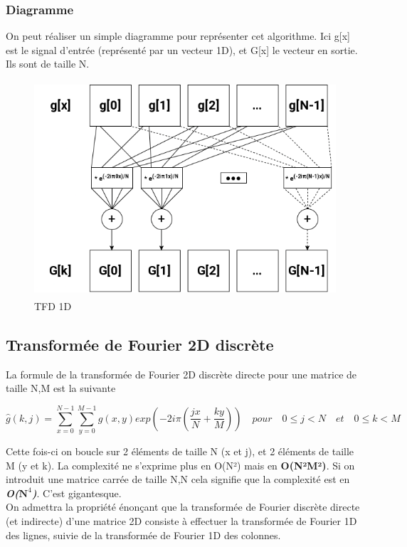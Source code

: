 \documentclass{article}
\begin{document}
\subsubsection{Diagramme}

On peut réaliser un simple diagramme pour représenter cet algorithme. Ici g[x] est le signal d'entrée (représenté par un vecteur 1D), et G[x] le vecteur en sortie. Ils sont de taille N.

\begin{figure}[!htb]
	\centering
	\includegraphics[height=8cm]{./assets/TFD1D.png}
	\caption{TFD 1D}
	\label{fig:TFD1D}
\end{figure}

\subsection{Transformée de Fourier 2D discrète}

La formule de la transformée de Fourier 2D discrète directe pour une matrice de taille N,M est la suivante

\begin{equation}
	\widehat{g}(k,j) = \sum_{x = 0}^{N-1}\sum_{y = 0}^{M-1}g(x,y) exp(-2i\pi(\frac{jx}{N}+\frac{ky}{M})) \quad pour \quad 0 \leq j < N\quad et \quad 0 \leq k < M
\end{equation}

Cette fois-ci on boucle sur 2 éléments de taille N (x et j), et 2 éléments de taille M (y et k). La complexité ne s'exprime plus en O(N²) mais en \textbf{O(N²M²)}. Si on introduit une matrice carrée de taille N,N cela signifie que la complexité est en \textbf{\textit{O($\textbf{N}^4$)}}. C'est gigantesque.\\

\noindent On admettra la propriété énonçant que la transformée de Fourier discrète directe (et indirecte) d'une matrice 2D consiste à effectuer la transformée de Fourier 1D des lignes, suivie de la transformée de Fourier 1D des colonnes.
\end{document}
